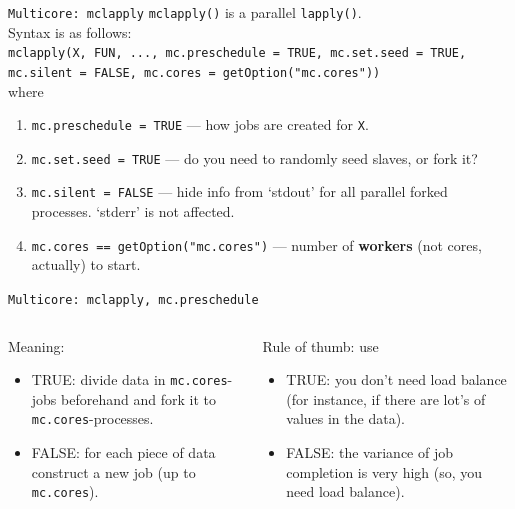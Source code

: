 \documentclass[aspectratio=169]{beamer}\usepackage[]{graphicx}\usepackage[]{color}
\begin{document}
\begin{frame}{\texttt{Multicore: mclapply}}
  \texttt{mclapply()} is a parallel \texttt{lapply()}.\\
  \bigskip
  Syntax is as follows:\\
  \texttt{mclapply(X, FUN, ..., 
         mc.preschedule = TRUE, mc.set.seed = TRUE,\\
         \quad mc.silent = FALSE, mc.cores = getOption("mc.cores"))} \\
  where \\
  \begin{enumerate}
    \item \texttt{mc.preschedule = TRUE} --- how jobs are created for \texttt{X}.
    \item \texttt{mc.set.seed = TRUE} --- do you need to randomly seed slaves, or fork it?
    \item \texttt{mc.silent = FALSE} --- hide info from `stdout' for all parallel forked processes. `stderr' is not affected.
    \item \texttt{mc.cores == getOption("mc.cores")} --- number of \textbf{workers} (not cores, actually) to start.
  \end{enumerate}
\end{frame}

\begin{frame}{\texttt{Multicore: mclapply, mc.preschedule}}
  \begin{columns}[T]
    \begin{column}{.48\textwidth}
      Meaning:
      \begin{itemize}
        \item TRUE: divide data in \texttt{mc.cores}-jobs beforehand and fork it to \texttt{mc.cores}-processes.
        \item FALSE: for each piece of data construct a new job (up to \texttt{mc.cores}).
      \end{itemize}
    \end{column}
    \pause
    \begin{column}{.48\textwidth}
      Rule of thumb: use
      \begin{itemize}
        \item TRUE: you don't need load balance (for instance, if there are lot's of values in the data).
        \item FALSE: the variance of job completion is very high (so, you need load balance).
      \end{itemize}    
    \end{column}
  \end{columns}
\end{frame}
\end{document}
